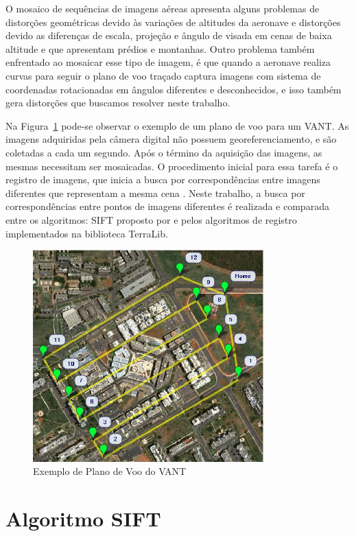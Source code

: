 \documentclass[9pt, a4paper, nofonttune, journal]{IEEEtran}
\begin{document}
O mosaico de sequências de imagens aéreas apresenta alguns problemas de distorções geométricas devido às variações de altitudes da aeronave e distorções devido as diferenças de escala, projeção e ângulo de visada em cenas de baixa altitude e que apresentam prédios e montanhas. Outro problema também enfrentado ao mosaicar esse tipo de imagem, é que quando a aeronave realiza curvas para seguir o plano de voo traçado captura imagens com sistema de coordenadas rotacionadas em ângulos diferentes e desconhecidos, e isso também gera distorções que buscamos resolver neste trabalho.

Na Figura~\ref{fig:plano_voo} pode-se observar o exemplo de um plano de voo para um VANT. As imagens adquiridas pela câmera digital não possuem georeferenciamento, e são coletadas a cada um segundo. Após o término da aquisição das imagens, as mesmas necessitam ser mosaicadas. O procedimento inicial para essa tarefa é o registro de imagens, que inicia a busca por correspondências entre imagens diferentes que representam a mesma cena \cite{goltz1}. Neste trabalho, a busca por correspondências entre pontos de imagens diferentes é realizada e comparada entre os algoritmos: SIFT proposto por \cite{lowe} e pelos algoritmos de registro implementados na biblioteca TerraLib.

\begin{figure}[h!t]
  \centering
  \includegraphics[width=3.5in]{figuras/plano_voo}
  \caption{Exemplo de Plano de Voo do VANT}
  \label{fig:plano_voo}
\end{figure}

\section{Algoritmo SIFT}
\end{document}
